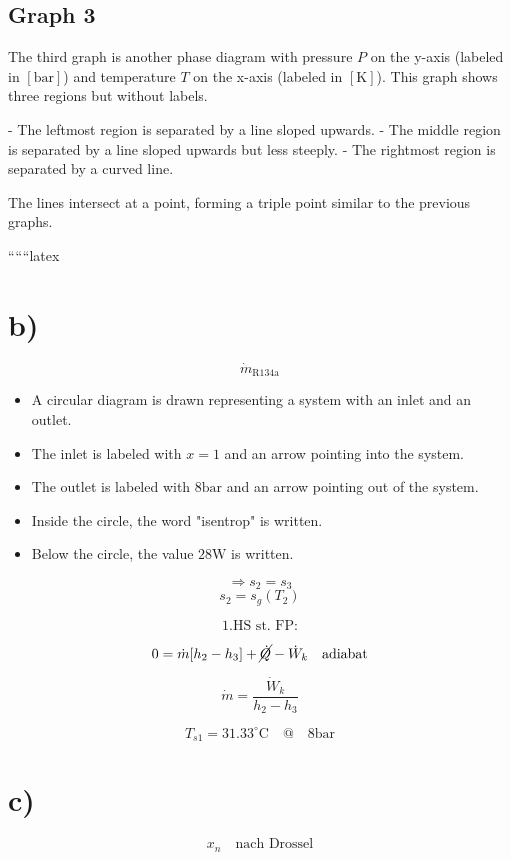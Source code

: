 \subsection*{Graph 3}
The third graph is another phase diagram with pressure \( P \) on the y-axis (labeled in \([ \text{bar} ]\)) and temperature \( T \) on the x-axis (labeled in \([ \text{K} ]\)). This graph shows three regions but without labels.

- The leftmost region is separated by a line sloped upwards.
- The middle region is separated by a line sloped upwards but less steeply.
- The rightmost region is separated by a curved line.

The lines intersect at a point, forming a triple point similar to the previous graphs.

``````latex


\section*{b)}

\[
\dot{m}_{\text{R134a}}
\]

\begin{itemize}
    \item A circular diagram is drawn representing a system with an inlet and an outlet.
    \item The inlet is labeled with $x=1$ and an arrow pointing into the system.
    \item The outlet is labeled with $8 \text{bar}$ and an arrow pointing out of the system.
    \item Inside the circle, the word "isentrop" is written.
    \item Below the circle, the value $28 \text{W}$ is written.
\end{itemize}

\[
\Rightarrow s_2 = s_3
\]
\[
s_2 = s_g(T_2)
\]

\[
\text{1.HS st. FP:}
\]

\[
0 = \dot{m} [h_2 - h_3] + \cancel{\dot{Q}} - \dot{W}_k \quad \text{adiabat}
\]

\[
\dot{m} = \frac{\dot{W}_k}{h_2 - h_3}
\]

\[
T_{s1} = 31.33^\circ \text{C} \quad @ \quad 8 \text{bar}
\]

\section*{c)}

\[
x_n \quad \text{nach Drossel}
\]

